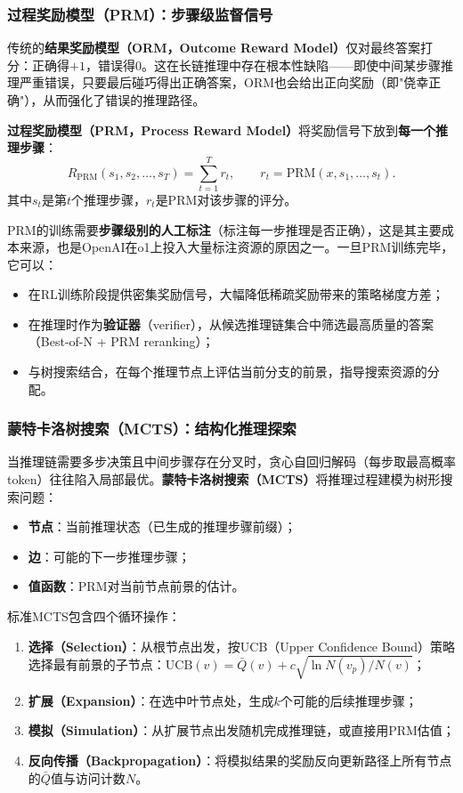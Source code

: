 \documentclass[12pt,a4paper]{article}
\begin{document}
\subsubsection{过程奖励模型（PRM）：步骤级监督信号}

传统的\textbf{结果奖励模型（ORM，Outcome Reward Model）}仅对最终答案打分：正确得$+1$，错误得$0$。这在长链推理中存在根本性缺陷——即使中间某步骤推理严重错误，只要最后碰巧得出正确答案，ORM也会给出正向奖励（即"侥幸正确"），从而强化了错误的推理路径。

\textbf{过程奖励模型（PRM，Process Reward Model）}将奖励信号下放到\textbf{每一个推理步骤}：
\begin{equation}
R_{\text{PRM}}(s_1, s_2, \ldots, s_T) = \sum_{t=1}^{T} r_t,\qquad r_t = \text{PRM}(x, s_1, \ldots, s_t).
\end{equation}
其中$s_t$是第$t$个推理步骤，$r_t$是PRM对该步骤的评分。

PRM的训练需要\textbf{步骤级别的人工标注}（标注每一步推理是否正确），这是其主要成本来源，也是OpenAI在o1上投入大量标注资源的原因之一。一旦PRM训练完毕，它可以：
\begin{itemize}
    \item 在RL训练阶段提供密集奖励信号，大幅降低稀疏奖励带来的策略梯度方差；
    \item 在推理时作为\textbf{验证器}（verifier），从候选推理链集合中筛选最高质量的答案（Best-of-N + PRM reranking）；
    \item 与树搜索结合，在每个推理节点上评估当前分支的前景，指导搜索资源的分配。
\end{itemize}

\subsubsection{蒙特卡洛树搜索（MCTS）：结构化推理探索}

当推理链需要多步决策且中间步骤存在分叉时，贪心自回归解码（每步取最高概率token）往往陷入局部最优。\textbf{蒙特卡洛树搜索（MCTS）}将推理过程建模为树形搜索问题：
\begin{itemize}
    \item \textbf{节点}：当前推理状态（已生成的推理步骤前缀）；
    \item \textbf{边}：可能的下一步推理步骤；
    \item \textbf{值函数}：PRM对当前节点前景的估计。
\end{itemize}

标准MCTS包含四个循环操作：
\begin{enumerate}
    \item \textbf{选择（Selection）}：从根节点出发，按UCB（Upper Confidence Bound）策略选择最有前景的子节点：$\text{UCB}(v) = \bar{Q}(v) + c\sqrt{\ln N(v_p)/N(v)}$；
    \item \textbf{扩展（Expansion）}：在选中叶节点处，生成$k$个可能的后续推理步骤；
    \item \textbf{模拟（Simulation）}：从扩展节点出发随机完成推理链，或直接用PRM估值；
    \item \textbf{反向传播（Backpropagation）}：将模拟结果的奖励反向更新路径上所有节点的$\bar{Q}$值与访问计数$N$。
\end{enumerate}
\end{document}
